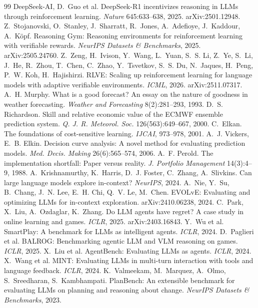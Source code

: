 \documentclass[10pt,a4paper,twocolumn]{article}
\begin{document}
\begin{thebibliography}{99}\small\setlength{\itemsep}{0pt}\setlength{\parskip}{0pt}
 DeepSeek-AI, D.~Guo et al. DeepSeek-R1 incentivizes reasoning in LLMs through reinforcement learning. \emph{Nature} 645:633--638, 2025. arXiv:2501.12948.
 Z.~Stojanovski, O.~Stanley, J.~Sharratt, R.~Jones, A.~Adefioye, J.~Kaddour, A.~K\"opf. Reasoning Gym: Reasoning environments for reinforcement learning with verifiable rewards. \emph{NeurIPS Datasets \& Benchmarks}, 2025. arXiv:2505.24760.
 Z.~Zeng, H.~Ivison, Y.~Wang, L.~Yuan, S.~S. Li, Z.~Ye, S.~Li, J.~He, R.~Zhou, T.~Chen, C.~Zhao, Y.~Tsvetkov, S.~S. Du, N.~Jaques, H.~Peng, P.~W. Koh, H.~Hajishirzi. RLVE: Scaling up reinforcement learning for language models with adaptive verifiable environments. \emph{ICML}, 2026. arXiv:2511.07317.
 A.~H. Murphy. What is a good forecast? An essay on the nature of goodness in weather forecasting. \emph{Weather and Forecasting} 8(2):281--293, 1993.
 D.~S. Richardson. Skill and relative economic value of the ECMWF ensemble prediction system. \emph{Q. J. R. Meteorol. Soc.} 126(563):649--667, 2000.
 C.~Elkan. The foundations of cost-sensitive learning. \emph{IJCAI}, 973--978, 2001.
 A.~J. Vickers, E.~B. Elkin. Decision curve analysis: A novel method for evaluating prediction models. \emph{Med. Decis. Making} 26(6):565--574, 2006.
 A.~F. Perold. The implementation shortfall: Paper versus reality. \emph{J. Portfolio Management} 14(3):4--9, 1988.
 A.~Krishnamurthy, K.~Harris, D.~J. Foster, C.~Zhang, A.~Slivkins. Can large language models explore in-context? \emph{NeurIPS}, 2024.
 A.~Nie, Y.~Su, B.~Chang, J.~N. Lee, E.~H. Chi, Q.~V. Le, M.~Chen. EVOLvE: Evaluating and optimizing LLMs for in-context exploration. arXiv:2410.06238, 2024.
 C.~Park, X.~Liu, A.~Ozdaglar, K.~Zhang. Do LLM agents have regret? A case study in online learning and games. \emph{ICLR}, 2025. arXiv:2403.16843.
 Y.~Wu et al. SmartPlay: A benchmark for LLMs as intelligent agents. \emph{ICLR}, 2024.
 D.~Paglieri et al. BALROG: Benchmarking agentic LLM and VLM reasoning on games. \emph{ICLR}, 2025.
 X.~Liu et al. AgentBench: Evaluating LLMs as agents. \emph{ICLR}, 2024.
 X.~Wang et al. MINT: Evaluating LLMs in multi-turn interaction with tools and language feedback. \emph{ICLR}, 2024.
 K.~Valmeekam, M.~Marquez, A.~Olmo, S.~Sreedharan, S.~Kambhampati. PlanBench: An extensible benchmark for evaluating LLMs on planning and reasoning about change. \emph{NeurIPS Datasets \& Benchmarks}, 2023.

\end{thebibliography}
\end{document}
